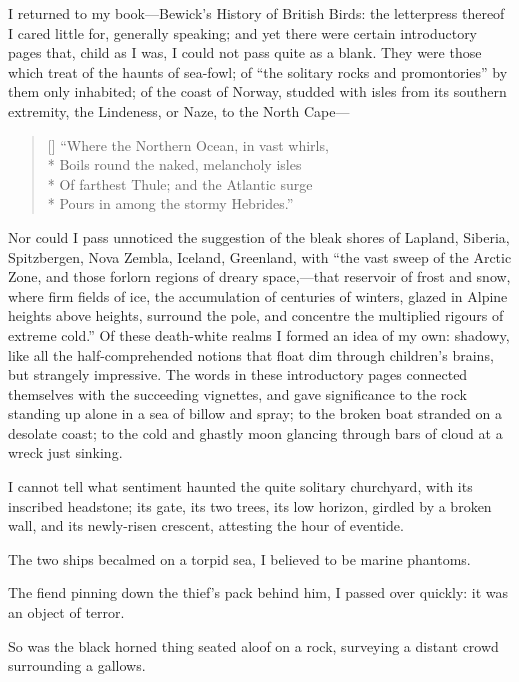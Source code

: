 I returned to my book---Bewick's History of British Birds: the
letterpress thereof I cared little for, generally speaking; and yet
there were certain introductory pages that, child as I was, I could not
pass quite as a blank. They were those which treat of the haunts of
sea-fowl; of \enquote{the solitary rocks and promontories} by them only
inhabited; of the coast of Norway, studded with isles from its southern
extremity, the Lindeness, or Naze, to the North Cape---

\begin{verse}[\versewidth]
\enquote{Where the Northern Ocean, in vast whirls,\\*
Boils round the naked, melancholy isles\\*
Of farthest Thule; and the Atlantic surge\\*
Pours in among the stormy Hebrides.}
\end{verse}

Nor could I pass unnoticed the suggestion of the bleak shores of
Lapland, Siberia, Spitzbergen, Nova Zembla, Iceland, Greenland, with
\enquote{the vast sweep of the Arctic Zone, and those forlorn regions of
dreary space,---that reservoir of frost and snow, where firm fields of
ice, the accumulation of centuries of winters, glazed in Alpine heights
above heights, surround the pole, and concentre the multiplied rigours
of extreme cold.} Of these death-white realms I formed an idea of my
own: shadowy, like all the half-comprehended notions that float dim
through children's brains, but strangely impressive. The words in these
introductory pages connected themselves with the succeeding vignettes,
and gave significance to the rock standing up alone in a sea of billow
and spray; to the broken boat stranded on a desolate coast; to the cold
and ghastly moon glancing through bars of cloud at a wreck just sinking.

I cannot tell what sentiment haunted the quite solitary churchyard, with
its inscribed headstone; its gate, its two trees, its low horizon,
girdled by a broken wall, and its newly-risen crescent, attesting the
hour of eventide.

The two ships becalmed on a torpid sea, I believed to be marine
phantoms.

The fiend pinning down the thief's pack behind him, I passed over
quickly: it was an object of terror.

So was the black horned thing seated aloof on a rock, surveying a
distant crowd surrounding a gallows.

